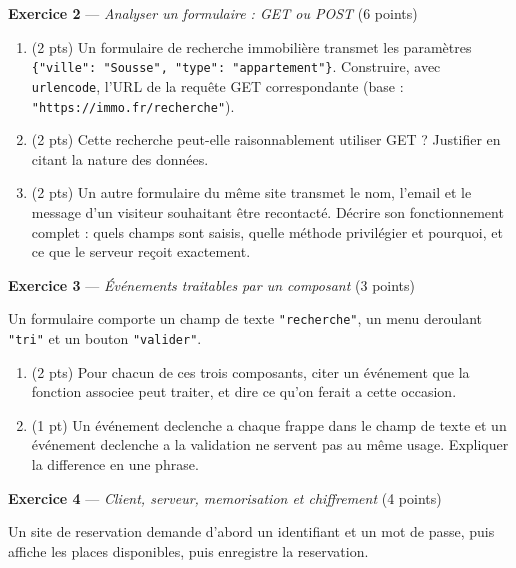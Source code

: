 \bigskip

\textbf{Exercice 2} --- \textit{Analyser un formulaire : GET ou POST} \hfill (6 points)

\begin{enumerate}
  \item (2 pts) Un formulaire de recherche immobilière transmet les paramètres \lstinline|{"ville": "Sousse", "type": "appartement"}|. Construire, avec \lstinline{urlencode}, l'URL de la requête GET correspondante (base : \lstinline{"https://immo.fr/recherche"}).
  \item (2 pts) Cette recherche peut-elle raisonnablement utiliser GET ? Justifier en citant la nature des données.
  \item (2 pts) Un autre formulaire du même site transmet le nom, l'email et le message d'un visiteur souhaitant être recontacté. Décrire son fonctionnement complet : quels champs sont saisis, quelle méthode privilégier et pourquoi, et ce que le serveur reçoit exactement.
\end{enumerate}


\bigskip

\textbf{Exercice 3} --- \textit{Événements traitables par un composant} \hfill (3 points)

Un formulaire comporte un champ de texte \lstinline{"recherche"}, un menu deroulant
\lstinline{"tri"} et un bouton \lstinline{"valider"}.

\begin{enumerate}
  \item (2 pts) Pour chacun de ces trois composants, citer un événement que la fonction
  associee peut traiter, et dire ce qu'on ferait a cette occasion.
  \item (1 pt) Un événement declenche a chaque frappe dans le champ de texte et un événement
  declenche a la validation ne servent pas au même usage. Expliquer la difference en une
  phrase.
\end{enumerate}

\bigskip

\textbf{Exercice 4} --- \textit{Client, serveur, memorisation et chiffrement} \hfill (4 points)

Un site de reservation demande d'abord un identifiant et un mot de passe, puis affiche les
places disponibles, puis enregistre la reservation.


